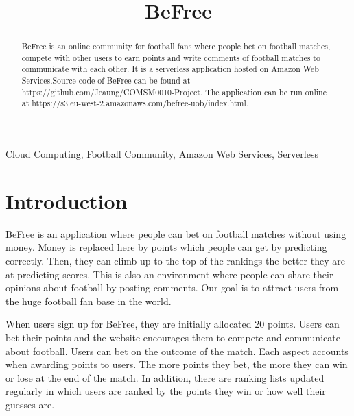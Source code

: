 \documentclass[conference]{IEEEtran}
\begin{document}
\title{BeFree\\}

\author{
\and
{}
}

\maketitle

\begin{abstract}
BeFree is an online community for football fans where
people bet on football matches, compete with other users
to earn points and write comments of football matches to communicate with each other. It is a serverless application hosted on Amazon Web Services.Source code of BeFree can be found at https://github.com/Jeaung/COMSM0010-Project. The application can be run online at https://s3.eu-west-2.amazonaws.com/befree-uob/index.html.
\end{abstract}

\begin{IEEEkeywords}
Cloud Computing, Football Community, Amazon Web Services, Serverless
\end{IEEEkeywords}

\section{Introduction}
BeFree is an application where people can bet on football
matches without using money. Money is replaced here by
points which people can get by predicting correctly. Then,
they can climb up to the top of the rankings the better they
are at predicting scores. This is also an environment
where people can share their opinions about football by
posting comments. Our goal is to attract users from the huge football
fan base in the world.

When users sign up for BeFree, they are initially
allocated 20 points. Users can bet
their points and the website encourages them to compete
and communicate about football. Users can bet on the outcome of the match. Each aspect
accounts when awarding points to users. The more points they
bet, the more they can win or lose at the end of the match.
In addition, there are ranking lists updated regularly in
which users are ranked by the points they win or how well
their guesses are.
\end{document}
